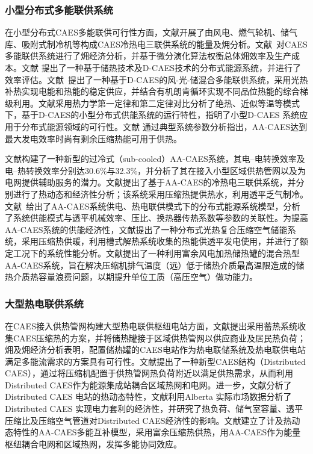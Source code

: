 \subsubsection{小型分布式多能联供系统}
在小型分布式CAES多能联供可行性方面，文献开展了由风电、燃气轮机、储气库、吸附式制冷机等构成CAES冷热电三联供系统的能量及㶲分析。文献~对CAES多能联供系统进行了㶲经济分析，并基于微分演化算法权衡总体㶲效率及生产成本。文献 提出了一种基于储热技术及D-CAES技术的分布式能源系统，并进行了效率评估。文献~提出了一种基于D-CAES的风-光-储混合多能联供系统，采用光热补热实现电能和热能的稳定供应，并结合有机朗肯循环实现不同品位热能的综合梯级利用。文献采用热力学第一定律和第二定律对比分析了绝热、近似等温等模式下，基于D-CAES的小型分布式供能系统的运行特性，指明了小型D-CAES 系统应用于分布式能源领域的可行性。文献
通过典型系统参数分析指出，AA-CAES达到最大发电效率时尚有剩余压缩热能可用于供热。

文献构建了一种新型的过冷式（sub-cooled）AA-CAES系统，其电–电转换效率及电–热转换效率分别达30.6\%与32.3\%，并分析了其在接入小型区域供热管网以及为电网提供辅助服务的潜力。文献提出了基于AA-CAES的冷热电三联供系统，并分别进行了热动态和经济性分析；该系统采用压缩热提供热水，利用透平乏气制冷。文献~给出了AA-CAES系统供电、热电联供模式下的分布式能源系统模型，分析了系统供能模式与透平机械效率、压比、换热器传热系数等参数的关联性。为提高AA-CAES系统的供能经济性，文献提出了一种分布式光热复合压缩空气储能系统，采用压缩热供暖，利用槽式解热系统收集的热能供透平发电使用，并进行了额定工况下的系统性能分析。文献提出了一种利用富余风电加热储热罐的混合热型AA-CAES系统，旨在解决压缩机排气温度（远）低于储热介质最高温限造成的储热介质热容量浪费问题，以期提升单位工质（高压空气）做功能力。


\subsubsection{大型热电联供系统}
在CAES接入供热管网构建大型热电联供枢纽电站方面，文献提出采用蓄热系统收集CAES压缩热的方案，并将储热罐接于区域供热管网以供应商业及居民热负荷；㶲及㶲经济分析表明，配置储热罐的CAES电站作为热电联储系统及热电联供电站满足多能流需求的方案具有可行性。文献提出了一种新型CAES结构（Distributed CAES），通过将压缩机配置于供热管网热负荷附近以满足供热需求，从而利用Distributed CAES作为能源集成站耦合区域热网和电网。进一步，文献分析了Distributed CAES 电站的热动态特性，文献利用Alberta 实际市场数据分析了Distributed CAES 实现电力套利的经济性，并研究了热负荷、储气室容量、透平压缩比及压缩空气管道对Distributed CAES经济性的影响。文献建立了计及热动态特性的AA-CAES多能互补模型，采用富余压缩热供热，用AA-CAES作为能量枢纽耦合电网和区域热网，发挥多能协同效应。

